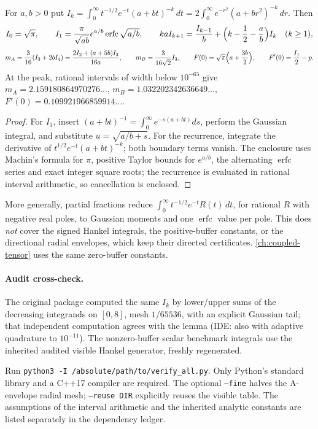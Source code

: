 \begin{lemma}
\label{lem:cc-resolvent}
For \(a,b>0\) put
\(I_k=\int_0^\infty t^{-1/2}e^{-t}(a+bt)^{-k}\,dt
 =2\int_0^\infty e^{-r^2}(a+br^2)^{-k}\,dr\). Then
\[
 I_0=\sqrt\pi,\qquad
 I_1=\frac{\pi}{\sqrt{ab}}e^{a/b}\operatorname{erfc}\sqrt{a/b},\qquad
 kaI_{k+1}=\frac{I_{k-1}}b+\Bigl(k-\frac12-\frac ab\Bigr)I_k\quad(k\ge1),
\]
\[
 m_A=\frac3{16}(I_3+2bI_4)=\frac{2I_2+(a+5b)I_3}{16a},\qquad
 m_B=\frac3{16\sqrt2}I_3,\qquad
 F(0)=\sqrt\pi\Bigl(a+\frac{3b}2\Bigr),\qquad F'(0)=\frac{I_1}2-p.
\]
At the peak, rational intervals of width below \(10^{-65}\) give
\(m_A=2.159180864970276\ldots\), \(m_B=1.032202342636649\ldots\),
\(F'(0)=0.109921966859914\ldots\).
\end{lemma}
\begin{proof}
For \(I_1\), insert \((a+bt)^{-1}=\int_0^\infty e^{-s(a+bt)}ds\), perform
the Gaussian integral, and substitute \(u=\sqrt{a/b+s}\). For the recurrence,
integrate the derivative of \(t^{1/2}e^{-t}(a+bt)^{-k}\); both boundary
terms vanish. The enclosure uses Machin's formula for \(\pi\), positive
Taylor bounds for \(e^{a/b}\), the alternating \(\operatorname{erfc}\) series
and exact integer square roots; the recurrence is evaluated in rational
interval arithmetic, so cancellation is enclosed.
\end{proof}
More generally, partial fractions reduce
\(\int_0^\infty t^{-1/2}e^{-t}R(t)\,dt\), for rational \(R\) with negative
real poles, to Gaussian moments and one \(\operatorname{erfc}\) value per
pole. This does \emph{not} cover the signed Hankel integrals, the
positive-buffer constants, or the directional radial envelopes, which keep
their directed certificates. \autoref{ch:coupled-tensor} uses the
same zero-buffer constants.

\paragraph{Audit cross-check.} The original package computed the same
\(I_k\) by lower/upper sums of the decreasing integrands on \([0,8]\),
mesh \(1/65536\), with an explicit Gaussian tail; that independent
computation agrees with the lemma (IDE: also with adaptive quadrature to
\(10^{-11}\)).
The nonzero-buffer scalar benchmark integrals use the inherited
audited visible Hankel generator, freshly regenerated.

Run \texttt{python3 -I /absolute/path/to/verify\_all.py}.
Only Python's standard library and a C++17 compiler are required.
The optional \texttt{--fine} halves the A-envelope radial mesh;
\texttt{--reuse DIR} explicitly reuses the visible table.
The assumptions of the interval arithmetic and the inherited
analytic constants are listed separately in the dependency ledger.

